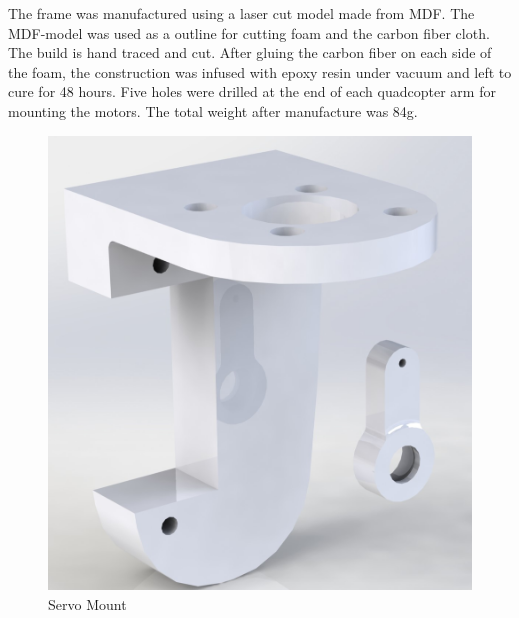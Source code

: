 \begin{figure}[H]
\end{figure} 


The frame was manufactured using a laser cut model made from MDF. The MDF-model was used as a outline for cutting foam and the carbon fiber cloth. The build is hand traced and cut. After gluing the carbon fiber on each side of the foam, the construction was infused with epoxy resin under vacuum and left to cure for 48 hours. Five holes were drilled at the end of each quadcopter arm for mounting the motors. The total weight after manufacture was 84g.

\begin{figure}[H]
        \centering
                \begin{minipage}[b]{0.35\textwidth}
            \includegraphics[width = \textwidth, angle= 0]{VAPIQ-PICTURES/ServoMountRender.jpg}
            \caption{Servo Mount}
            \label{fig:Bracket}
                    \end{minipage}
                 \hfill
         \begin{minipage}[b]{0.5\textwidth}

\end{minipage}
\end{figure}
